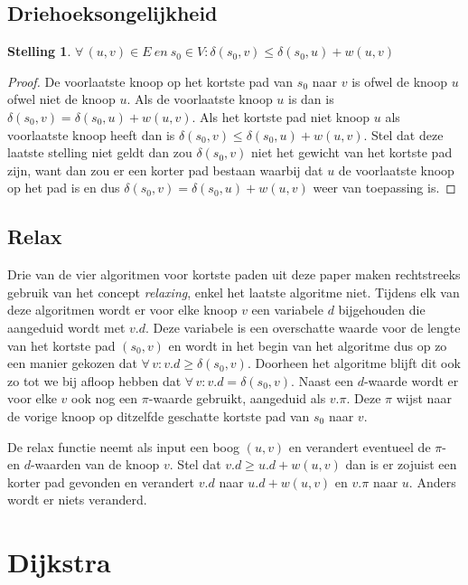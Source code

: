 \documentclass[conference]{IEEEtran}
\newtheorem{theorem}{Stelling}[section]
\theoremstyle{definition}
\theoremstyle{remark}
\let \oldforall \forall
\renewcommand{\forall}{\oldforall\,}
\begin{document}
\subsection{Driehoeksongelijkheid} \label{concepts:driehoeksongelijkheid}
\begin{theorem}
    $\forall (u, v) \in E\ en\ s_0 \in V: \delta(s_0, v) \leq \delta(s_0, u) + w(u, v)$
\end{theorem}
\begin{proof}
    De voorlaatste knoop op het kortste pad van $s_0$ naar $v$ is ofwel de knoop $u$ ofwel niet de knoop $u$. Als de voorlaatste knoop $u$ is dan is $\delta(s_0, v) = \delta(s_0, u) + w(u, v)$. Als het kortste pad niet knoop $u$ als voorlaatste knoop heeft dan is $\delta(s_0, v) \leq \delta(s_0, u) + w(u, v)$. Stel dat deze laatste stelling niet geldt dan zou $\delta(s_0, v)$ niet het gewicht van het kortste pad zijn, want dan zou er een korter pad bestaan waarbij dat $u$ de voorlaatste knoop op het pad is en dus $\delta(s_0, v) = \delta(s_0, u) + w(u, v)$ weer van toepassing is.
\end{proof}

\subsection{Relax} \label{concepts:relax}
Drie van de vier algoritmen voor kortste paden uit deze paper maken rechtstreeks gebruik van het concept \textit{relaxing}, enkel het laatste algoritme niet. Tijdens elk van deze algoritmen wordt er voor elke knoop $v$ een variabele $d$ bijgehouden die aangeduid wordt met $v.d$. Deze variabele is een  overschatte waarde voor de lengte van het kortste pad $(s_0, v)$ en wordt in het begin van het algoritme dus op zo een manier gekozen dat $\forall v: v.d \geq \delta(s_0, v)$. Doorheen het algoritme blijft dit ook zo tot we bij afloop hebben dat $\forall v: v.d = \delta(s_0, v)$. Naast een $d$-waarde wordt er voor elke $v$ ook nog een $\pi$-waarde gebruikt, aangeduid als $v.\pi$. Deze $\pi$ wijst naar de vorige knoop op ditzelfde geschatte kortste pad van $s_0$ naar $v$.

De relax functie neemt als input een boog $(u, v)$ en verandert eventueel de $\pi$- en $d$-waarden van de knoop $v$. Stel dat $v.d \geq u.d + w(u, v)$ dan is er zojuist een korter pad gevonden en verandert $v.d$ naar $u.d + w(u, v)$ en $v.\pi$ naar $u$. Anders wordt er niets veranderd.

\section{Dijkstra}
\end{document}
